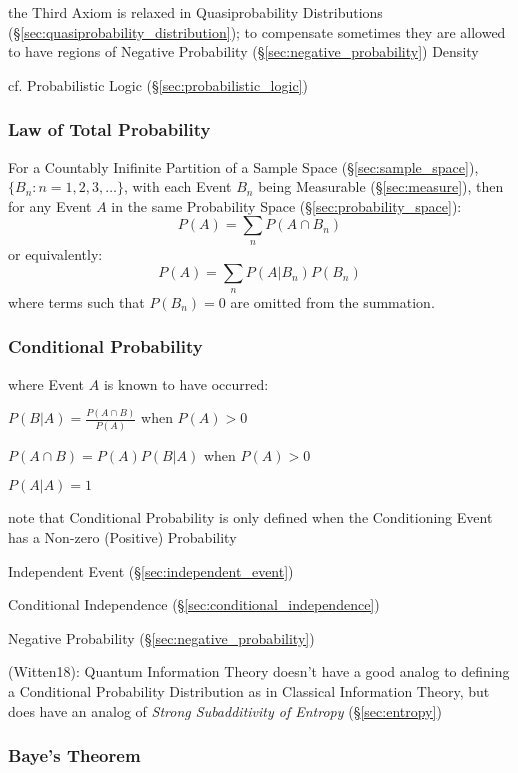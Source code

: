 the Third Axiom is relaxed in Quasiprobability Distributions
(\S\ref{sec:quasiprobability_distribution}); to compensate sometimes they are
allowed to have regions of Negative Probability
(\S\ref{sec:negative_probability}) Density

\fist cf. Probabilistic Logic (\S\ref{sec:probabilistic_logic})



\subsubsection{Law of Total Probability}\label{sec:total_probability}

For a Countably Inifinite Partition of a Sample Space
(\S\ref{sec:sample_space}), $\{ B_n : n = 1,2,3,\ldots \}$, with each
Event $B_n$ being Measurable (\S\ref{sec:measure}), then for any Event
$A$ in the same Probability Space (\S\ref{sec:probability_space}):
\[
  P(A) = \sum_n P(A \cap B_n)
\]
or equivalently:
\[
  P(A) = \sum_n P(A|B_n) P(B_n)
\]
where terms such that $P(B_n) = 0$ are omitted from the summation.



\subsubsection{Conditional Probability}
\label{sec:conditional_probability}

where Event $A$ is known to have occurred:

$P(B|A) = \frac{P(A \cap B)}{P(A)}$ when $P(A) > 0$

$P(A \cap B) = P(A) P(B|A)$ when $P(A) > 0$

$P(A|A) = 1$

note that Conditional Probability is only defined when the Conditioning Event
has a Non-zero (Positive) Probability

\fist Independent Event (\S\ref{sec:independent_event})

\fist Conditional Independence (\S\ref{sec:conditional_independence})

\fist Negative Probability (\S\ref{sec:negative_probability})

(Witten18): Quantum Information Theory doesn't have a good analog to defining a
Conditional Probability Distribution as in Classical Information Theory, but
does have an analog of \emph{Strong Subadditivity of Entropy}
(\S\ref{sec:entropy})



\subsubsection{Baye's Theorem}\label{sec:bayes_theorem}

